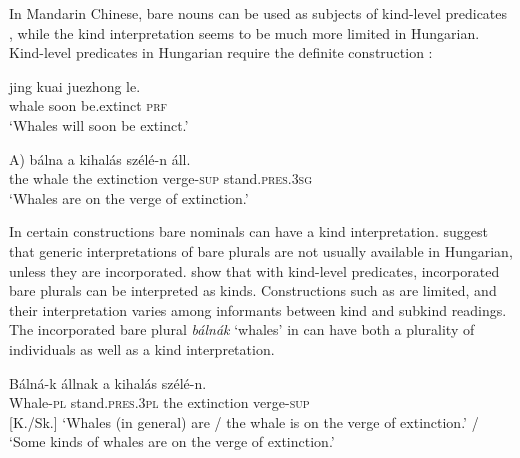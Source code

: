 \documentclass[output=paper]{langscibook}
\begin{document}
In Mandarin Chinese, bare nouns can be used as subjects of kind-level predicates  \citep{li-13}, while the kind interpretation seems to be much more limited in Hungarian. Kind-level predicates in Hungarian require the definite construction :

\ea \label{schv-nem:ex:37} \gll jing kuai juezhong le.\\  
whale soon be.extinct \textsc{prf}\\
\glt `Whales will soon be extinct.'\hfill \citep[Mandarin Chinese;][p. 90, ex. (4)]{li-13}
\z


\ea \gll \minsp{*(} A) bálna a kihalás szélé-n áll.\\  
{} the whale the extinction verge-\textsc{sup} stand.\textsc{pres}.\textsc{3sg}\\ 
\glt `Whales are on the verge of extinction.' \label{schv-nem:ex:38}
\z

\noindent In certain constructions bare nominals can have a kind interpretation. \citet{farkas-deswart-03} suggest that generic interpretations of bare plurals are not usually available in Hungarian, unless they are incorporated. \citet{schvarcz-rothstein-17} show that with kind-level predicates, incorporated bare plurals can be interpreted as kinds. Constructions such as  are limited, and their interpretation varies among informants between kind and subkind readings. The incorporated bare plural \textit{bálnák} `whales' in  can have both a plurality of individuals as well as a kind interpretation.

\ea \label{schv-nem:ex:39}
\gll Bálná-k állnak a kihalás szélé-n.	\\
Whale-\textsc{pl} stand.\textsc{pres}.\textsc{3pl} the  extinction verge-\textsc{sup}\\ \hfill [K./Sk.]
\glt `Whales (in general) are / the whale is on the verge of extinction.' / `Some kinds of whales are on the verge of extinction.'  \\\hfill  \citep[p. 188, (13)]{schvarcz-rothstein-17}
\z
\end{document}
